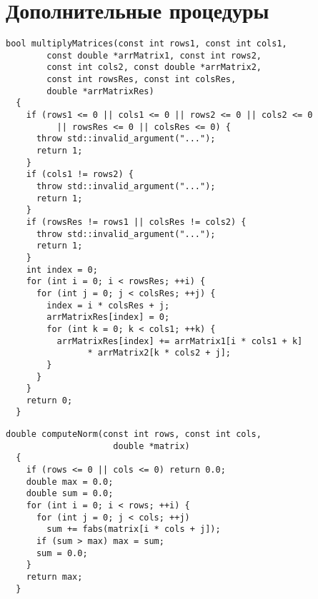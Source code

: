 \documentclass[a4paper,11pt]{article}
\begin{document}
\section{Дополнительные процедуры}
\begin{lstlisting}[label=multiplyMatrices, caption=Multiply Matrices]
  bool multiplyMatrices(const int rows1, const int cols1,
        const double *arrMatrix1, const int rows2,
        const int cols2, const double *arrMatrix2,
        const int rowsRes, const int colsRes,
        double *arrMatrixRes)
  {
    if (rows1 <= 0 || cols1 <= 0 || rows2 <= 0 || cols2 <= 0
          || rowsRes <= 0 || colsRes <= 0) {
      throw std::invalid_argument("...");
      return 1;
    }
    if (cols1 != rows2) {
      throw std::invalid_argument("...");
      return 1;
    }
    if (rowsRes != rows1 || colsRes != cols2) {
      throw std::invalid_argument("...");
      return 1;
    }
    int index = 0;
    for (int i = 0; i < rowsRes; ++i) {
      for (int j = 0; j < colsRes; ++j) {
        index = i * colsRes + j;
        arrMatrixRes[index] = 0;
        for (int k = 0; k < cols1; ++k) {
          arrMatrixRes[index] += arrMatrix1[i * cols1 + k]
                * arrMatrix2[k * cols2 + j];
        }
      }
    }
    return 0;
  }
\end{lstlisting}
\begin{lstlisting}[label=multiplyMatrices, caption=Compute Norm]
  double computeNorm(const int rows, const int cols,
                     double *matrix)
  {
    if (rows <= 0 || cols <= 0) return 0.0;
    double max = 0.0;
    double sum = 0.0;
    for (int i = 0; i < rows; ++i) {
      for (int j = 0; j < cols; ++j)
        sum += fabs(matrix[i * cols + j]);
      if (sum > max) max = sum;
      sum = 0.0;
    }
    return max;
  }
\end{lstlisting}
\end{document}
